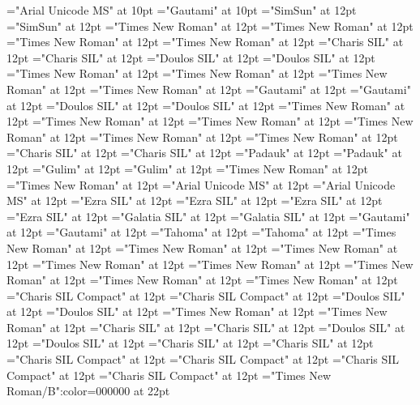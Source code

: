 \documentclass[a4paper]{article}
\begin{document}
\font\xitemhi="Arial Unicode MS" at 10pt
\font\xitemte="Gautami" at 10pt
\font\spanzhCN="SimSun" at 12pt
\font\divzhCN="SimSun" at 12pt
\font\spanur="Times New Roman" at 12pt
\font\divur="Times New Roman" at 12pt
\font\spanurxind="Times New Roman" at 12pt
\font\divurxind="Times New Roman" at 12pt
\font\spantr="Charis SIL" at 12pt
\font\divtr="Charis SIL" at 12pt
\font\spantrfonipa="Doulos SIL" at 12pt
\font\divtrfonipa="Doulos SIL" at 12pt
\font\spantrfonipaxemic="Times New Roman" at 12pt
\font\divtrfonipaxemic="Times New Roman" at 12pt
\font\spantpi="Times New Roman" at 12pt
\font\divtpi="Times New Roman" at 12pt
\font\spante="Gautami" at 12pt
\font\divte="Gautami" at 12pt
\font\spanseh="Doulos SIL" at 12pt
\font\divseh="Doulos SIL" at 12pt
\font\spanru="Times New Roman" at 12pt
\font\divru="Times New Roman" at 12pt
\font\spanqaaxcam="Times New Roman" at 12pt
\font\divqaaxcam="Times New Roman" at 12pt
\font\spanpt="Times New Roman" at 12pt
\font\divpt="Times New Roman" at 12pt
\font\spannko="Charis SIL" at 12pt
\font\divnko="Charis SIL" at 12pt
\font\spanmy="Padauk" at 12pt
\font\divmy="Padauk" at 12pt
\font\spanko="Gulim" at 12pt
\font\divko="Gulim" at 12pt
\font\spanid="Times New Roman" at 12pt
\font\divid="Times New Roman" at 12pt
\font\spanhi="Arial Unicode MS" at 12pt
\font\divhi="Arial Unicode MS" at 12pt
\font\spanhe="Ezra SIL" at 12pt
\font\divhe="Ezra SIL" at 12pt
\font\spanhbo="Ezra SIL" at 12pt
\font\divhbo="Ezra SIL" at 12pt
\font\spangrc="Galatia SIL" at 12pt
\font\divgrc="Galatia SIL" at 12pt
\font\spanggoTeluIN="Gautami" at 12pt
\font\divggoTeluIN="Gautami" at 12pt
\font\spanggofonipaxemic="Tahoma" at 12pt
\font\divggofonipaxemic="Tahoma" at 12pt
\font\spanfr="Times New Roman" at 12pt
\font\divfr="Times New Roman" at 12pt
\font\spanfa="Times New Roman" at 12pt
\font\divfa="Times New Roman" at 12pt
\font\spanes="Times New Roman" at 12pt
\font\dives="Times New Roman" at 12pt
\font\spanen="Times New Roman" at 12pt
\font\diven="Times New Roman" at 12pt
\font\spanenQaaaxtest="Charis SIL Compact" at 12pt
\font\divenQaaaxtest="Charis SIL Compact" at 12pt
\font\spanenfonipa="Doulos SIL" at 12pt
\font\divenfonipa="Doulos SIL" at 12pt
\font\spande="Times New Roman" at 12pt
\font\divde="Times New Roman" at 12pt
\font\spanbzh="Charis SIL" at 12pt
\font\divbzh="Charis SIL" at 12pt
\font\spanbzhfonipa="Doulos SIL" at 12pt
\font\divbzhfonipa="Doulos SIL" at 12pt
\font\spanbss="Charis SIL" at 12pt
\font\divbss="Charis SIL" at 12pt
\font\spanbssxako="Charis SIL Compact" at 12pt
\font\divbssxako="Charis SIL Compact" at 12pt
\font\spanbssfonipa="Charis SIL Compact" at 12pt
\font\divbssfonipa="Charis SIL Compact" at 12pt
\color{black} 
\thispagestyle{empty} 
\font\CoverPageHeading="Times New Roman/B":color=000000 at 22pt 
\vskip 60pt 
\begin{center} 
\end{center} 
\newpage 
\newpage 
\thispagestyle{empty} 
\mbox{} 
\end{document}
